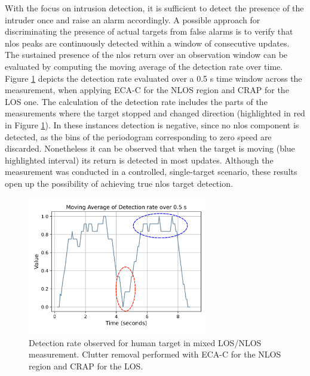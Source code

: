 With the focus on intrusion detection, it is sufficient to detect the presence of the intruder once and raise an alarm accordingly.
A possible approach for discriminating the presence of actual targets from false alarms is to verify that \gls{nlos} peaks are continuously detected within a window of consecutive updates.
The sustained presence of the \gls{nlos} return over an observation window can be evaluated by computing the moving average of the detection rate over time.
Figure \ref{fig:Test1_detect_mov_avg} depicts the detection rate evaluated over a 0.5 s time window across the measurement, when applying ECA-C for the NLOS region and CRAP for the LOS one.
The calculation of the detection rate includes the parts of the measurements where the target stopped and changed direction (highlighted in red in Figure \ref{fig:Test1_detect_mov_avg}).
In these instances detection is negative, since no \gls{nlos} component is detected, as the bins of the periodogram corresponding to zero speed are discarded.
Nonetheless it can be observed that when the target is moving (\eg blue highlighted interval) its return is detected in most updates.
Although the measurement was conducted in a controlled, single-target scenario, these results open up the possibility of achieving true \gls{nlos} target detection.

\begin{figure}[H]
	\centering
	\includegraphics[width=0.7\textwidth]{Images/exec_specific/detect_mov_avg_bluepoli_highlighted.png}
	\caption{\small Detection rate observed for human target in mixed LOS/NLOS measurement. Clutter removal performed with ECA-C for the NLOS region and CRAP for the LOS.}
	\label{fig:Test1_detect_mov_avg}
\end{figure}
